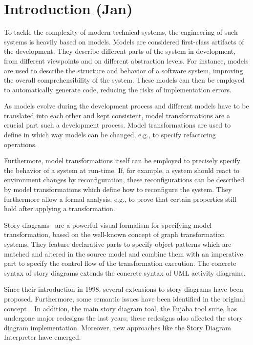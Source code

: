 \chapter{Introduction (Jan)}
To tackle the complexity of modern technical systems, the engineering of such systems is heavily based on models.
Models are considered first-class artifacts of the development.
They describe different parts of the system in development, from different viewpoints and on different abstraction levels.
For instance, models are used to describe the structure and behavior of a software system, improving the overall comprehensibility of the system.
These models can then be employed to automatically generate code, reducing the risks of implementation errors.

As models evolve during the development process and different models have to be translated into each other and kept consistent, model transformations are a crucial part such a development process.
Model transformations are used to define in which way models can be changed, e.g., to specify refactoring operations.

Furthermore, model transformations itself can be employed to precisely specify the behavior of a system at run-time.
If, for example, a system should react to environment changes by reconfiguration, these reconfigurations can be described by model transformations which define how to reconfigure the system.
They furthermore allow a formal analysis, e.g., to prove that certain properties still hold after applying a transformation.

Story diagrams~\cite{ZSW99,FNTZ00,Zun01} are a powerful visual formalism for specifying model transformation, based on the well-known concept of graph transformation systems.
They feature declarative parts to specify object patterns which are matched and altered in the source model and combine them with an imperative part to specify the control flow of the transformation execution.
The concrete syntax of story diagrams extends the concrete syntax of UML activity diagrams.

Since their introduction in 1998, several extensions to story diagrams have been proposed.
Furthermore, some semantic issues have been identified in the original concept~\cite{TMG06}.
In addition, the main story diagram tool, the Fujaba tool suite, has undergone major redesigns the last years; these redesigns also affected the story diagram implementation.
Moreover, new approaches like the Story Diagram Interpreter have emerged.

